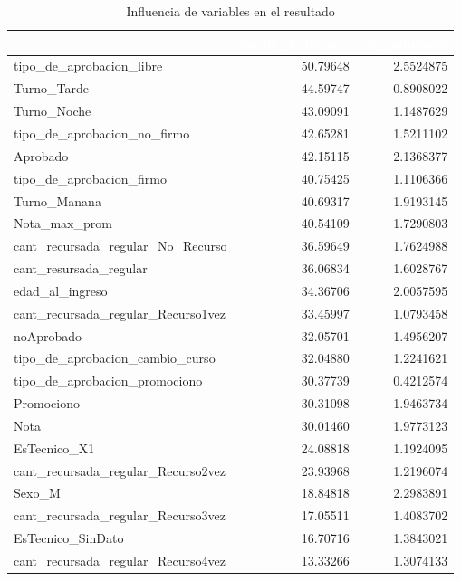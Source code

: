 \begin{table}[!h]
	
	\caption{\label{tab:tf_rfe_influencia_variables_23}Influencia de variables en el resultado}
	\centering
	\begin{tabular}[t]{lrr}
		\toprule
		\rowcolor{black}  \multicolumn{1}{c}{\textcolor{white}{\textbf{var}}} & \multicolumn{1}{c}{\textcolor{white}{\textbf{media\_influencia}}} & \multicolumn{1}{c}{\textcolor{white}{\textbf{sd\_influencia}}}\\
		\midrule
		\rowcolor{gray!6}  tipo\_de\_aprobacion\_libre & 50.79648 & 2.5524875\\
		Turno\_Tarde & 44.59747 & 0.8908022\\
		\rowcolor{gray!6}  Turno\_Noche & 43.09091 & 1.1487629\\
		tipo\_de\_aprobacion\_no\_firmo & 42.65281 & 1.5211102\\
		\rowcolor{gray!6}  Aprobado & 42.15115 & 2.1368377\\
		\addlinespace
		tipo\_de\_aprobacion\_firmo & 40.75425 & 1.1106366\\
		\rowcolor{gray!6}  Turno\_Manana & 40.69317 & 1.9193145\\
		Nota\_max\_prom & 40.54109 & 1.7290803\\
		\rowcolor{gray!6}  cant\_recursada\_regular\_No\_Recurso & 36.59649 & 1.7624988\\
		cant\_resursada\_regular & 36.06834 & 1.6028767\\
		\addlinespace
		\rowcolor{gray!6}  edad\_al\_ingreso & 34.36706 & 2.0057595\\
		cant\_recursada\_regular\_Recurso1vez & 33.45997 & 1.0793458\\
		\rowcolor{gray!6}  noAprobado & 32.05701 & 1.4956207\\
		tipo\_de\_aprobacion\_cambio\_curso & 32.04880 & 1.2241621\\
		\rowcolor{gray!6}  tipo\_de\_aprobacion\_promociono & 30.37739 & 0.4212574\\
		\addlinespace
		Promociono & 30.31098 & 1.9463734\\
		\rowcolor{gray!6}  Nota & 30.01460 & 1.9773123\\
		EsTecnico\_X1 & 24.08818 & 1.1924095\\
		\rowcolor{gray!6}  cant\_recursada\_regular\_Recurso2vez & 23.93968 & 1.2196074\\
		Sexo\_M & 18.84818 & 2.2983891\\
		\addlinespace
		\rowcolor{gray!6}  cant\_recursada\_regular\_Recurso3vez & 17.05511 & 1.4083702\\
		EsTecnico\_SinDato & 16.70716 & 1.3843021\\
		\rowcolor{gray!6}  cant\_recursada\_regular\_Recurso4vez & 13.33266 & 1.3074133\\
		\bottomrule
	\end{tabular}
\end{table}


